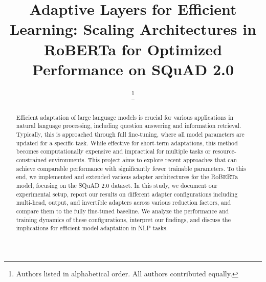 \documentclass[conference]{IEEEtran}
\begin{document}
\title{Adaptive Layers for Efficient Learning: Scaling Architectures in RoBERTa for Optimized Performance on SQuAD 2.0\*}

\author{
    \thanks{ Authors listed in alphabetical order. All authors contributed equally.}
}

\maketitle


\begin{abstract}

Efficient adaptation\cite{b3} of large language models is crucial for various applications in natural language processing, including question answering and information retrieval. Typically, this is approached through full fine-tuning, where all model parameters are updated for a specific task. While effective for short-term adaptations, this method becomes computationally expensive and impractical for multiple tasks or resource-constrained environments. This project aims to explore recent approaches that can achieve comparable performance with significantly fewer trainable parameters\cite{b6,b7}. To this end, we implemented and extended various adapter architectures for the RoBERTa model, focusing on the SQuAD 2.0 dataset. In this study, we document our experimental setup, report our results on different adapter configurations including multi-head, output, and invertible adapters across various reduction factors, and compare them to the fully fine-tuned baseline. We analyze the performance and training dynamics of these configurations, interpret our findings, and discuss the implications for efficient model adaptation in NLP tasks.

\end{abstract}
\end{document}
